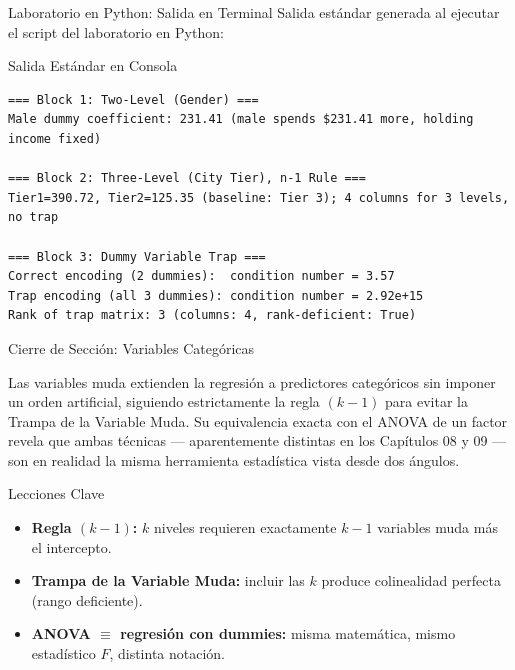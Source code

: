 \documentclass[10pt, aspectratio=169]{beamer}
\begin{document}
\begin{frame}[fragile]{Laboratorio en Python: Salida en Terminal}
  \scriptsize
  Salida estándar generada al ejecutar el script del laboratorio en Python:
  \vspace{0.02cm}
  \begin{block}{Salida Estándar en Consola}
    \fontsize{3.2pt}{3.9pt}\selectfont
    \begin{verbatim}
=== Block 1: Two-Level (Gender) ===
Male dummy coefficient: 231.41 (male spends $231.41 more, holding income fixed)

=== Block 2: Three-Level (City Tier), n-1 Rule ===
Tier1=390.72, Tier2=125.35 (baseline: Tier 3); 4 columns for 3 levels, no trap

=== Block 3: Dummy Variable Trap ===
Correct encoding (2 dummies):  condition number = 3.57
Trap encoding (all 3 dummies): condition number = 2.92e+15
Rank of trap matrix: 3 (columns: 4, rank-deficient: True)
    \end{verbatim}
  \end{block}
\end{frame}

\begin{frame}{Cierre de Sección: Variables Categóricas}
  \begin{reflexion}
    Las variables muda extienden la regresión a predictores categóricos sin imponer un orden artificial, siguiendo estrictamente la regla $(k-1)$ para evitar la Trampa de la Variable Muda. Su equivalencia exacta con el ANOVA de un factor revela que ambas técnicas --- aparentemente distintas en los Capítulos 08 y 09 --- son en realidad la misma herramienta estadística vista desde dos ángulos.
  \end{reflexion}

  \vspace{0.2cm}
  \pause
  \begin{block}{Lecciones Clave}
    \begin{itemize}\itemsep=0.08cm
      \item \textbf{Regla $(k-1)$:} $k$ niveles requieren exactamente $k-1$ variables muda más el intercepto.
      \item \textbf{Trampa de la Variable Muda:} incluir las $k$ produce colinealidad perfecta (rango deficiente).
      \item \textbf{ANOVA $\equiv$ regresión con dummies:} misma matemática, mismo estadístico $F$, distinta notación.
    \end{itemize}
  \end{block}
\end{frame}
\end{document}
